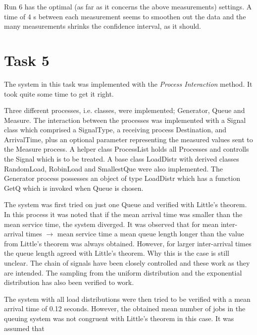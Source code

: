 \documentclass[]{article}
\begin{document}
Run 6 has the optimal (as far as it concerns the above measurements) settings.
A time of 4 s between each measurement seems to smoothen out the data and the many measurements shrinks the confidence interval, as it should.

\section{Task 5}
The system in this task was implemented with the {\it Process Interaction} method.
It took quite some time to get it right.

Three different processes, i.e. classes, were implemented; Generator, Queue and Measure.
The interaction between the processes was implemented with a Signal class which comprised a SignalType, a receiving process Destination, and ArrivalTime, plus an optional parameter representing the measured values sent to the Measure process.
A helper class ProcessList holds all Processes and controlls the Signal which is to be treated.
A base class LoadDistr with derived classes RandomLoad, RobinLoad and SmallestQue were also implemented.
The Generator process possesses an object of type LoadDistr which has a function GetQ which is invoked when Queue is chosen.

The system was first tried on just one Queue and verified with Little's theorem.
In this process it was noted that if the mean arrival time was smaller than the mean service time, the system diverged.
It was observed that for mean inter-arrival times $\rightarrow$ mean service time a mean queue length longer than the value from Little's theorem was always obtained.
However, for larger inter-arrival times the queue length agreed with Little's theorem.
Why this is the case is still unclear.
The chain of signals have been closely controlled and these work as they are intended.
The sampling from the uniform distribution and the exponential distribution has also been verified to work.

The system with all load distributions were then tried to be verified with a mean arrival time of 0.12 seconds.
However, the obtained mean number of jobs in the queuing system was not congruent with Little's theorem in this case.
It was assumed that
\end{document}
